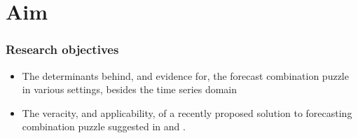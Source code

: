 
\section{Aim}

\begin{frame}
    \frametitle{Research objectives}

    \begin{itemize}
        \item The determinants behind, and evidence for, the forecast combination puzzle in various settings, besides the time series domain \newline
        \item The veracity, and applicability, of a recently proposed solution to forecasting combination puzzle suggested in \cite{ZMFP22} and \cite{FZMP23}.
    \end{itemize}
    
\end{frame}

